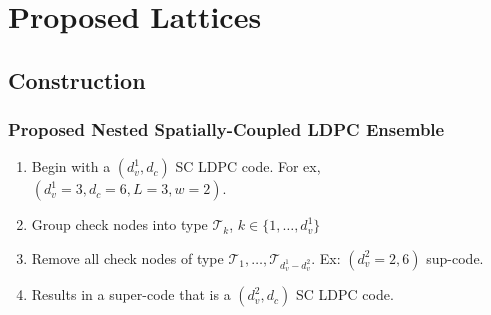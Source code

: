 \documentclass[10pt]{beamer}
\begin{document}
\section{Proposed Lattices}
\subsection{Construction}
\begin{frame}\frametitle{Proposed Nested Spatially-Coupled LDPC Ensemble}
    \begin{enumerate}
        \item<1-> Begin with a $(d_v^1,d_c)$ SC LDPC code. For ex, $(d_v^1=3,d_c=6,L=3,w=2)$. 
        \item<1-> Group check nodes into type $\mathcal{T}_k$, $k\in\{1,\ldots,d_v^1\}$
         \vspace{2pt}
        \item<2-> Remove all check nodes of type $\mathcal{T}_1,\ldots,\mathcal{T}_{d_v^1-d_v^2}$. Ex: $(d_{v}^{2}=2,6)$ sup-code.
                 \vspace{2pt}
        \item<3-> Results in a super-code that is a $(d_v^2,d_c)$ SC LDPC code.
    \end{enumerate}
    \vspace{0.15in}
    \begin{figure}
        \begin{center}

\end{center}
\end{figure}
\end{frame}
\end{document}
